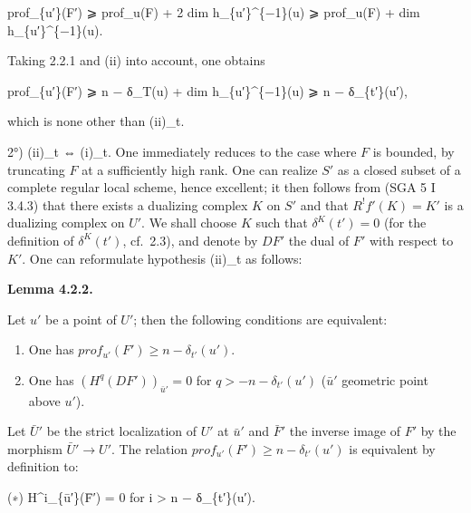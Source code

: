 \documentclass[
]{article}
\newenvironment{Shaded}{}{}
\newcommand{\NormalTok}[1]{#1}
\begin{document}
\begin{Shaded}
\begin{Highlighting}[]
\NormalTok{prof\_\{u′\}(F′) ⩾ prof\_u(F) + 2 dim h\_\{u′\}\^{}\{−1\}(u) ⩾ prof\_u(F) + dim h\_\{u′\}\^{}\{−1\}(u).}
\end{Highlighting}
\end{Shaded}

Taking 2.2.1 and (ii) into account, one obtains

\begin{Shaded}
\begin{Highlighting}[]
\NormalTok{prof\_\{u′\}(F′) ⩾ n − δ\_T(u) + dim h\_\{u′\}\^{}\{−1\}(u) ⩾ n − δ\_\{t′\}(u′),}
\end{Highlighting}
\end{Shaded}

which is none other than (ii)\_t.

2°) (ii)\_t ⇔ (i)\_t. One immediately reduces to the case where \(F\) is
bounded, by truncating \(F\) at a sufficiently high rank. One can
realize \(S'\) as a closed subset of a complete regular local scheme,
hence excellent; it then follows from (SGA 5 I 3.4.3) that there exists
a dualizing complex \(K\) on \(S'\) and that \(R^{!} f'(K) = K'\) is a
dualizing complex on \(U'\). We shall choose \(K\) such that
\(\delta^{K}(t') = 0\) (for the definition of \(\delta^{K}(t')\),
cf.~2.3), and denote by \(DF'\) the dual of \(F'\) with respect to
\(K'\). One can reformulate hypothesis (ii)\_t as follows:

\textbf{Lemma 4.2.2.}

Let \(u'\) be a point of \(U'\); then the following conditions are
equivalent:

\begin{enumerate}
\def\labelenumi{(\roman{enumi})}
\item
  One has \(prof_{u'}(F') \geqslant n - \delta_{t'}(u')\).
\item
  One has \((H^{q}(DF'))_{\bar{u}'} = 0\) for
  \(q > -n - \delta_{t'}(u')\) (\(\bar{u}'\) geometric point above
  \(u'\)).
\end{enumerate}

Let \(\bar{U}'\) be the strict localization of \(U'\) at \(\bar{u}'\)
and \(\bar{F}'\) the inverse image of \(F'\) by the morphism
\(\bar{U}' \to U'\). The relation
\(prof_{u'}(F') \geqslant n - \delta_{t'}(u')\) is equivalent by
definition to:

\begin{Shaded}
\begin{Highlighting}[]
\NormalTok{(∗) H\^{}i\_\{ū′\}(F̄′) = 0 for i \textgreater{} n − δ\_\{t′\}(u′).}
\end{Highlighting}
\end{Shaded}
\end{document}
